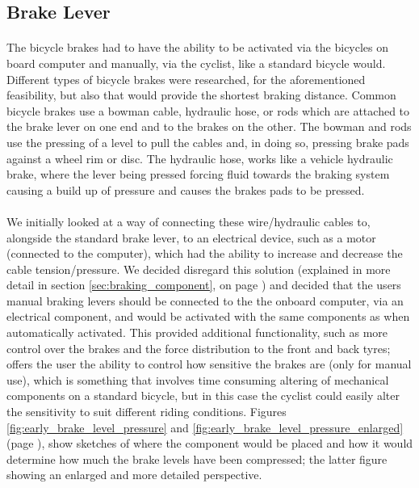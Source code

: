 \documentclass[a4paper]{report}
\begin{document}
\subsection{Brake Lever}
\label{sec:brake_lever}

\paragraph{}The bicycle brakes had to have the ability to be activated via the bicycles on board computer and manually, via the cyclist, like a standard bicycle would. Different types of bicycle brakes were researched, for the aforementioned feasibility, but also that would provide the shortest braking distance. Common bicycle brakes use a bowman cable, hydraulic hose, or rods which are attached to the brake lever on one end and to the brakes on the other. The bowman and rods use the pressing of a level to pull the cables and, in doing so, pressing brake pads against a wheel rim or disc. The hydraulic hose, works like a vehicle hydraulic brake, where the lever being pressed forcing fluid towards the braking system causing a build up of pressure and causes the brakes pads to be pressed. 



\paragraph{}We initially looked at a way of connecting these wire/hydraulic cables to, alongside the standard brake lever, to an electrical device, such as a motor (connected to the computer), which had the ability to increase and decrease the cable tension/pressure. We decided disregard this solution (explained in more detail in section \ref{sec:braking_component}, on page \pageref{sec:braking_component}) and decided that the users manual braking levers should be connected to the the onboard computer, via an electrical component, and would be activated with the same components as when automatically activated. This provided additional functionality, such as more control over the brakes and the force distribution to the front and back tyres; offers the user the ability to control how sensitive the brakes are (only for manual use), which is something that involves time consuming altering of mechanical components on a standard bicycle, but in this case the cyclist could easily alter the sensitivity to suit different riding conditions. Figures \ref{fig:early_brake_level_pressure} and \ref{fig:early_brake_level_pressure_enlarged} (page \pageref{app:early_sketches}), show sketches of where the component would be placed and how it would determine how much the brake levels have been compressed; the latter figure showing an enlarged and more detailed perspective.  
\end{document}
